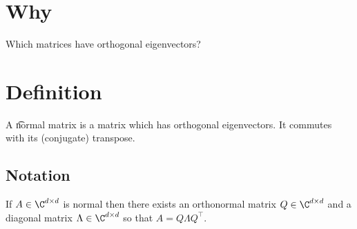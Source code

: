 

\section*{Why}

Which matrices have orthogonal eigenvectors?

\section*{Definition}

A \t{normal matrix} is a matrix which has orthogonal eigenvectors.
It commutes with its (conjugate) transpose.

\subsection*{Notation}

If $A \in \C ^{d \times d}$ is normal then there exists an orthonormal matrix $Q \in \C ^{d \times d}$ and a diagonal matrix $\Lambda  \in \C ^{d \times d}$ so that $A = Q\Lambda  Q^\top $.

\blankpage